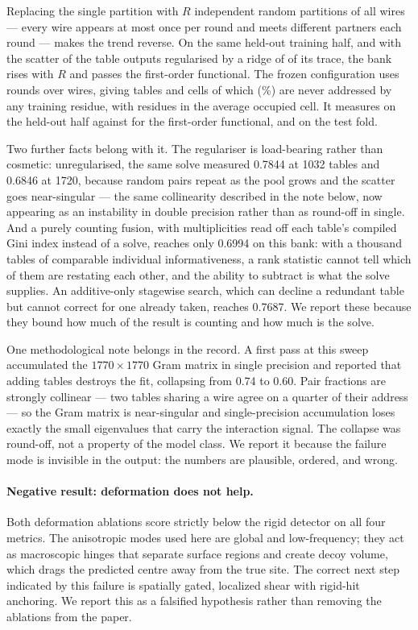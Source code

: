 \documentclass[11pt]{article}
\begin{document}
Replacing the single partition with \(R\) independent random partitions of all
wires --- every wire appears at most once per round and meets different partners
each round --- makes the trend reverse. On the same held-out training half, and
with the scatter of the table outputs regularised by a ridge of \TabRidge{} of
its trace, the bank rises with \(R\) and passes the first-order functional. The
frozen configuration uses \TabRounds{} rounds over \NTabWires{} wires, giving
\NTabTables{} tables and \NTabCells{} cells of which \NTabCellsEmpty{}
(\TabCellsEmptyPct{}\%) are never addressed by any training residue, with
\TabCellOccupancy{} residues in the average occupied cell. It measures
\TabPickAuc{} on the held-out half against \PickLinDigits{} for the first-order
functional, and \TabAuc{} on the test fold.

Two further facts belong with it. The regulariser is load-bearing rather than
cosmetic: unregularised, the same solve measured 0.7844 at 1032 tables and 0.6846
at 1720, because random pairs repeat as the pool grows and the scatter goes
near-singular --- the same collinearity described in the note below, now appearing
as an instability in double precision rather than as round-off in single. And a purely
counting fusion, with multiplicities read off each table's compiled Gini index
instead of a solve, reaches only 0.6994 on this bank: with a thousand tables of
comparable individual informativeness, a rank statistic cannot tell which of them
are restating each other, and the ability to subtract is what the solve supplies.
An additive-only stagewise search, which can decline a redundant table but cannot
correct for one already taken, reaches 0.7687. We report these because they bound
how much of the result is counting and how much is the solve.

One methodological note belongs in the record. A first pass at this sweep
accumulated the \(1770\times1770\) Gram matrix in single precision and reported
that adding tables destroys the fit, collapsing from 0.74 to 0.60. Pair
fractions are strongly collinear --- two tables sharing a wire agree on a quarter
of their address --- so the Gram matrix is near-singular and single-precision
accumulation loses exactly the small eigenvalues that carry the interaction
signal. The collapse was round-off, not a property of the model class. We report
it because the failure mode is invisible in the output: the numbers are
plausible, ordered, and wrong.

\paragraph{Negative result: deformation does not help.} Both deformation
ablations score strictly below the rigid detector on all four metrics. The
anisotropic modes used here are global and low-frequency; they act as
macroscopic hinges that separate surface regions and create decoy volume, which
drags the predicted centre away from the true site. The correct next step
indicated by this failure is spatially gated, localized shear with rigid-hit
anchoring. We report this as a falsified hypothesis rather than removing the
ablations from the paper.
\end{document}
